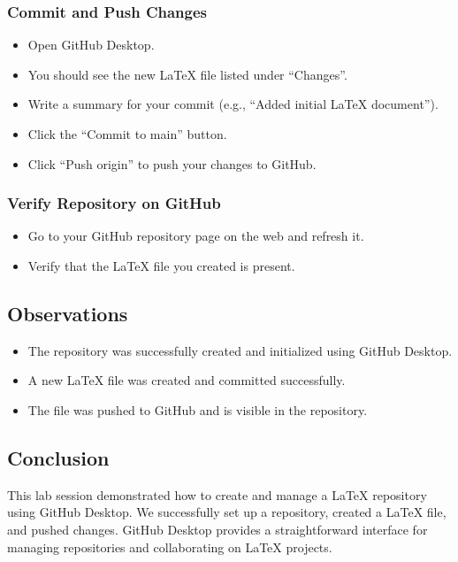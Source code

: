 \subsubsection{Commit and Push Changes}  %
\begin{itemize}
    \item Open GitHub Desktop.
    \item You should see the new LaTeX file listed under “Changes”.
    \item Write a summary for your commit (e.g., “Added initial LaTeX document”).
    \item Click the “Commit to main” button.
    \item Click “Push origin” to push your changes to GitHub.
\end{itemize}

\subsubsection{Verify Repository on GitHub}  %
\begin{itemize}
    \item Go to your GitHub repository page on the web and refresh it.
    \item Verify that the LaTeX file you created is present.
\end{itemize}

\subsection{Observations}  %
\begin{itemize}
    \item The repository was successfully created and initialized using GitHub Desktop.
    \item A new LaTeX file was created and committed successfully.
    \item The file was pushed to GitHub and is visible in the repository.
\end{itemize}

\subsection{Conclusion}  %
This lab session demonstrated how to create and manage a LaTeX repository using GitHub Desktop. We successfully set up a repository, created a LaTeX file, and pushed changes. GitHub Desktop provides a straightforward interface for managing repositories and collaborating on LaTeX projects.
